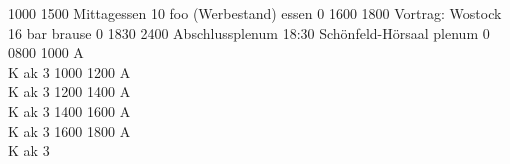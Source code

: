 \documentclass[a5paper,9pt]{scrreprt}
\begin{document}
\begin{center}
\begin{timetable}
   {1000} {1500} {Mittagessen}      {10} {foo (Werbestand)}  {} {essen}   {0}
   {1600} {1800} {Vortrag: Wostock} {16} {bar}               {} {brause}  {0}
   {1830} {2400} {Abschlussplenum}  {18:30} {Schönfeld-Hörsaal} {} {plenum}  {0}
   {0800} {1000} {\hfill A\\ \hfill K} {} {}               {} {ak}      {3}
   {1000} {1200} {\hfill A\\ \hfill K} {} {}               {} {ak}      {3}
   {1200} {1400} {\hfill A\\ \hfill K} {} {}               {} {ak}      {3}
   {1400} {1600} {\hfill A\\ \hfill K} {} {}               {} {ak}      {3}
   {1600} {1800} {\hfill A\\ \hfill K} {} {}               {} {ak}      {3}
\end{timetable}
\end{center}
\end{document}
